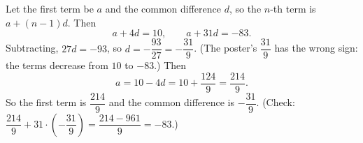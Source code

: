Let the first term be $a$ and the common difference $d$, so the $n$-th term is $a+(n-1)d$. Then
\[
a+4d=10,\qquad a+31d=-83 .
\]
Subtracting, $27d=-93$, so $d=-\dfrac{93}{27}=-\dfrac{31}{9}$. (The poster's $\dfrac{31}{9}$ has the wrong sign: the terms decrease from $10$ to $-83$.) Then
\[
a=10-4d=10+\dfrac{124}{9}=\dfrac{214}{9}.
\]
So the first term is $\boxed{\dfrac{214}{9}}$ and the common difference is $\boxed{-\dfrac{31}{9}}$. (Check: $\dfrac{214}{9}+31\cdot\left(-\dfrac{31}{9}\right)=\dfrac{214-961}{9}=-83$.)
